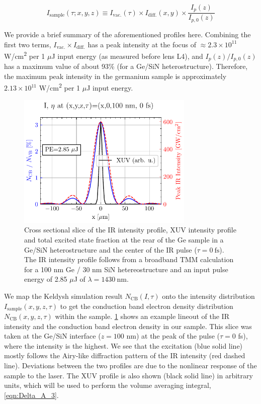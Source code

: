 \begin{equation}
I_{\textrm{sample}}(\tau; x, y, z) \equiv I_{\textrm{vac.}}(\tau) \times I_{\textrm{diff.}}(x, y) \times \frac{I_p(z)}{I_{p,0}(z)}
\label{eqn:sample_intensity_XYZtau}
\end{equation}

We provide a brief summary of the aforementioned profiles here. Combining the first two terms, $I_{\textrm{vac.}} \times I_{\textrm{diff.}}$ has a peak intensity at the focus of $\approx 2.3 \times 10^{11}$ W/cm\textsuperscript{2} per 1 $\mu$J input energy (as measured before lens L4), and $I_p(z) / I_{p,0}(z)$ has a maximum value of about 93\% (for a Ge/SiN heterostructure). Therefore, the maximum peak intensity in the germanium sample is approximately $2.13 \times 10^{11}$ W/cm\textsuperscript{2} per 1 $\mu$J input energy. 

\begin{figure}
	\centering
	\includegraphics[width=0.75\textwidth]{figures/chap4/excitation_at_focus.pdf}
	\caption{Cross sectional slice of the IR intensity profile, XUV intensity profile and total excited state fraction at the rear of the Ge sample in a Ge/SiN heterostructure and the center of the IR pulse ($\tau = 0 \ \textrm{fs}$). The IR intensity profile follows from a broadband TMM calculation for a 100 nm Ge / 30 nm SiN hetereostructure and an input pulse energy of {2.85 $\mu$J} of $\lambda = 1430 \ \textrm{nm}$.}
	\label{fig:excitation_at_focus}
\end{figure}

We map the Keldysh simulation result $N_{\textrm{CB}}(I, \tau)$ onto the intensity distribution $I_{\textrm{sample}}(x, y, z, \tau)$ to get the conduction band electron density distribution $N_{\textrm{CB}}(x, y, z, \tau)$ within the sample. \cref{fig:excitation_at_focus} shows an example lineout of the IR intensity and the conduction band electron density in our sample. This slice was taken at the Ge/SiN interface ($z=100$ nm) at the peak of the pulse ($\tau=0$ fs), where the intensity is the highest. We see that the excitation (blue solid line) mostly follows the Airy-like diffraction pattern of the IR intensity (red dashed line). Deviations between the two profiles are due to the nonlinear response of the sample to the laser. The XUV profile is also shown (black solid line) in arbitrary units, which will be used to perform the volume averaging integral, \cref{eqn:Delta_A_3}.


